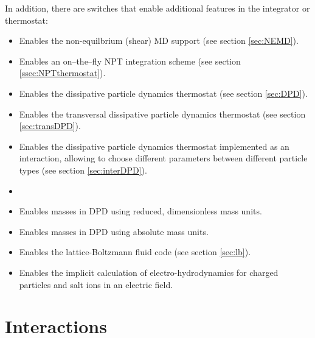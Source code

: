 In addition, there are switches that enable additional features in the
integrator or thermostat:
\begin{itemize}
\item {} Enables the non-equilbrium (shear) MD support
  (see section \vref{sec:NEMD}).
\item {} Enables an on--the--fly NPT integration scheme
  (see section \vref{ssec:NPTthermostat}).
\item {} Enables the dissipative particle dynamics
  thermostat (see section \vref{sec:DPD}).
\item {} Enables the transversal dissipative
  particle dynamics thermostat (see section \vref{sec:transDPD}).
\item {} Enables the dissipative
  particle dynamics thermostat implemented as an interaction,
  allowing to choose different parameters between different particle
  types (see section \vref{sec:interDPD}).
\item {} 
\item {} Enables masses in DPD using reduced,
  dimensionless mass units.
\item {} Enables masses in DPD using absolute
  mass units.
\item {} Enables the lattice-Boltzmann fluid code (see
  section \vref{sec:lb}).
\item {} Enables the implicit
  calculation of electro-hydrodynamics for charged particles and salt
  ions in an electric field.
\end{itemize}

\section{Interactions}

